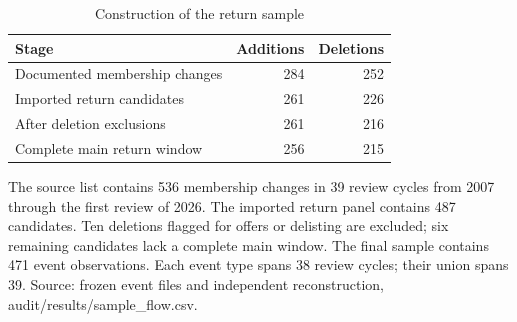 \begin{table}[!htbp]
\centering
\caption{Construction of the return sample}\label{tab:sample}
\small
\setlength{\tabcolsep}{5pt}
\begin{tabular}{lrr}
\toprule
Stage & Additions & Deletions \\
\midrule
Documented membership changes & 284 & 252 \\
Imported return candidates & 261 & 226 \\
After deletion exclusions & 261 & 216 \\
Complete main return window & 256 & 215 \\
\bottomrule
\end{tabular}
\begin{minipage}{\linewidth}\footnotesize\vspace{5pt}
The source list contains 536 membership changes in 39 review cycles from 2007 through the first review of 2026. The imported return panel contains 487 candidates. Ten deletions flagged for offers or delisting are excluded; six remaining candidates lack a complete main window. The final sample contains 471 event observations. Each event type spans 38 review cycles; their union spans 39. Source: frozen event files and independent reconstruction, audit/results/sample\_flow.csv.
\end{minipage}
\end{table}
